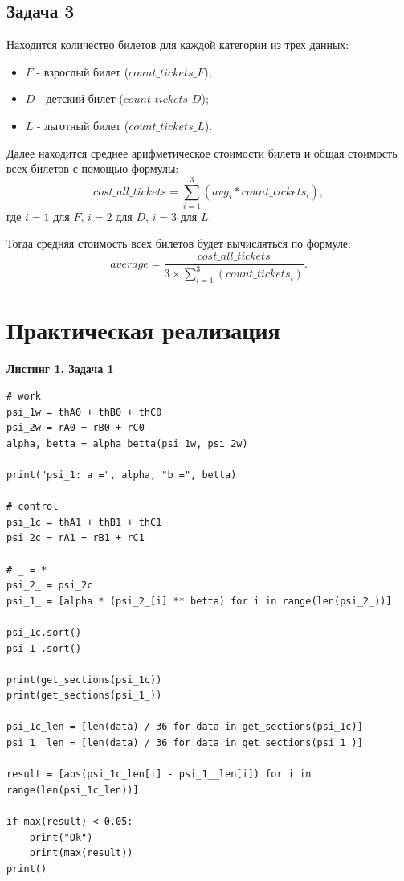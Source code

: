 \documentclass[a4paper, 12pt]{article}   	%
\begin{document}
\subsection{Задача 3}
    Находится количество билетов для каждой категории из трех данных:
    \begin{itemize}
        \item $F$ - взрослый билет ($count\_tickets\_F$);
        \item $D$ - детский билет ($count\_tickets\_D$);
        \item $L$ - льготный билет ($count\_tickets\_L$).
    \end{itemize}
    
    Далее находится среднее арифметическое стоимости билета и общая стоимость всех билетов с помощью формулы:
    \begin{equation}
        cost\_all\_tickets = \sum^{3}_{i=1}{(avg_i * count\_tickets_i)},
    \end{equation}
    где $i = 1$ для $F$, $i = 2$ для $D$, $i = 3$ для $L$.
    
    Тогда средняя стоимость всех билетов будет вычисляться по формуле:
    \begin{equation}
        average = \frac{cost\_all\_tickets}{3 \times \sum^{3}_{i=1}{(count\_tickets_i)}}.
    \end{equation}
    
    



\newpage

\section{Практическая реализация}

\textbf{Листинг 1. Задача 1} 
\begin{verbatim}
# work
psi_1w = thA0 + thB0 + thC0
psi_2w = rA0 + rB0 + rC0
alpha, betta = alpha_betta(psi_1w, psi_2w)

print("psi_1: a =", alpha, "b =", betta)

# control
psi_1c = thA1 + thB1 + thC1
psi_2c = rA1 + rB1 + rC1

# _ = *
psi_2_ = psi_2c
psi_1_ = [alpha * (psi_2_[i] ** betta) for i in range(len(psi_2_))]

psi_1c.sort()
psi_1_.sort()

print(get_sections(psi_1c))
print(get_sections(psi_1_))

psi_1c_len = [len(data) / 36 for data in get_sections(psi_1c)]
psi_1__len = [len(data) / 36 for data in get_sections(psi_1_)]

result = [abs(psi_1c_len[i] - psi_1__len[i]) for i in range(len(psi_1c_len))]

if max(result) < 0.05:
	print("Ok")
	print(max(result))
print()
\end{verbatim}
\end{document}

